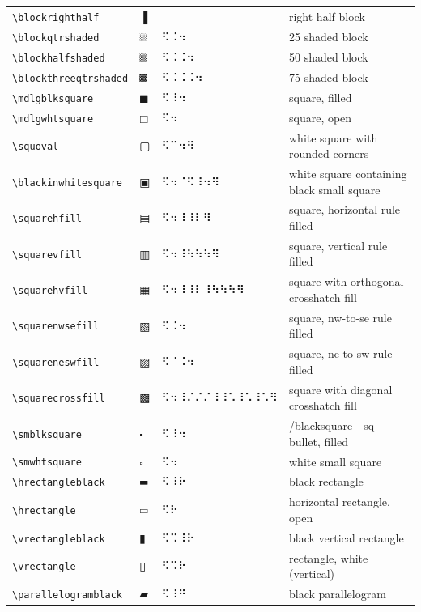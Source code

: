 \documentclass[oneside]{article}
\begin{document}
\begin{longtable}{llll}
\verb|\blockrighthalf| & $\blockrighthalf$ &    & {right half block} \\[2ex]
\verb|\blockqtrshaded| & $\blockqtrshaded$ &  ⠫⠨⠲  & {25 shaded block} \\[2ex]
\verb|\blockhalfshaded| & $\blockhalfshaded$ &  ⠫⠨⠨⠲  & {50 shaded block} \\[2ex]
\verb|\blockthreeqtrshaded| & $\blockthreeqtrshaded$ &  ⠫⠨⠨⠨⠲  & {75 shaded block} \\[2ex]
\verb|\mdlgblksquare| & $\mdlgblksquare$ &  ⠫⠸⠲  & {square, filled} \\[2ex]
\verb|\mdlgwhtsquare| & $\mdlgwhtsquare$ &  ⠫⠲  & {square, open} \\[2ex]
\verb|\squoval| & $\squoval$ &  ⠫⠉⠲⠻  & {white square with rounded corners} \\[2ex]
\verb|\blackinwhitesquare| & $\blackinwhitesquare$ &  ⠫⠲⠈⠫⠸⠲⠻  & {white square containing black small square} \\[2ex]
\verb|\squarehfill| & $\squarehfill$ &  ⠫⠲⠸⠸⠇⠻  & {square, horizontal rule filled} \\[2ex]
\verb|\squarevfill| & $\squarevfill$ &  ⠫⠲⠸⠳⠳⠳⠻  & {square, vertical rule filled} \\[2ex]
\verb|\squarehvfill| & $\squarehvfill$ &  ⠫⠲⠸⠸⠇⠸⠳⠳⠳⠻  & {square with orthogonal crosshatch fill} \\[2ex]
\verb|\squarenwsefill| & $\squarenwsefill$ &  ⠫⠨⠲  & {square, nw-to-se rule filled} \\[2ex]
\verb|\squareneswfill| & $\squareneswfill$ &  ⠫⠈⠨⠲  & {square, ne-to-sw rule filled} \\[2ex]
\verb|\squarecrossfill| & $\squarecrossfill$ &  ⠫⠲⠸⠌⠌⠌⠸⠸⠡⠸⠡⠸⠡⠻  & {square with diagonal crosshatch fill} \\[2ex]
\verb|\smblksquare| & $\smblksquare$ &  ⠫⠸⠲  & {/blacksquare - sq bullet, filled} \\[2ex]
\verb|\smwhtsquare| & $\smwhtsquare$ &  ⠫⠲  & {white small square} \\[2ex]
\verb|\hrectangleblack| & $\hrectangleblack$ &  ⠫⠸⠗  & {black rectangle} \\[2ex]
\verb|\hrectangle| & $\hrectangle$ &  ⠫⠗  & {horizontal rectangle, open} \\[2ex]
\verb|\vrectangleblack| & $\vrectangleblack$ &  ⠫⠩⠸⠗  & {black vertical rectangle} \\[2ex]
\verb|\vrectangle| & $\vrectangle$ &  ⠫⠩⠗  & {rectangle, white (vertical)} \\[2ex]
\verb|\parallelogramblack| & $\parallelogramblack$ &  ⠫⠸⠛  & {black parallelogram} \\[2ex]

\end{longtable}
\end{document}
